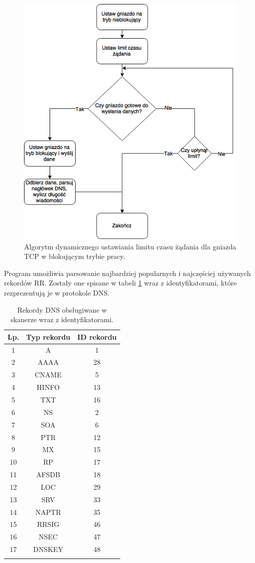 \begin{figure}[ht]
	\centering
	\includegraphics[width=1.0\textwidth]{image/socketAlg}
	\caption{Algorytm dynamicznego ustawiania limitu czasu żądania dla gniazda TCP w blokującym trybie pracy.}
	\label{fig:socketAlg}
\end{figure}

Program umożliwia parsowanie najbardziej popularnych i najczęściej używanych rekordów RR. Zostały one spisane w tabeli \ref{records}
wraz z identyfikatorami, które rezprezentują je w protokole DNS.

\begin{longtable}{|c|c|c|}
	\hline
	\textbf{Lp.} &
	\textbf{Typ rekordu} &
	\textbf{ID rekordu} \\ \hline\hline
	1 & A & 1 \\
	2 & AAAA & 28 \\
    3 & CNAME & 5 \\
	4 & HINFO & 13 \\
	5 & TXT & 16 \\
	6 & NS & 2 \\
	7 & SOA & 6 \\
	8 & PTR & 12 \\
	9 & MX & 15 \\
	10 & RP & 17 \\
	11 & AFSDB & 18 \\
	12 & LOC & 29 \\
	13 & SRV & 33 \\
	14 & NAPTR & 35 \\
	15 & RRSIG & 46 \\
	16 & NSEC & 47 \\
	17 & DNSKEY & 48 \\
	\hline
	\caption{Rekordy DNS obsługiwane w skanerze wraz z identyfikatorami.}
	\label{records}
\end{longtable}

